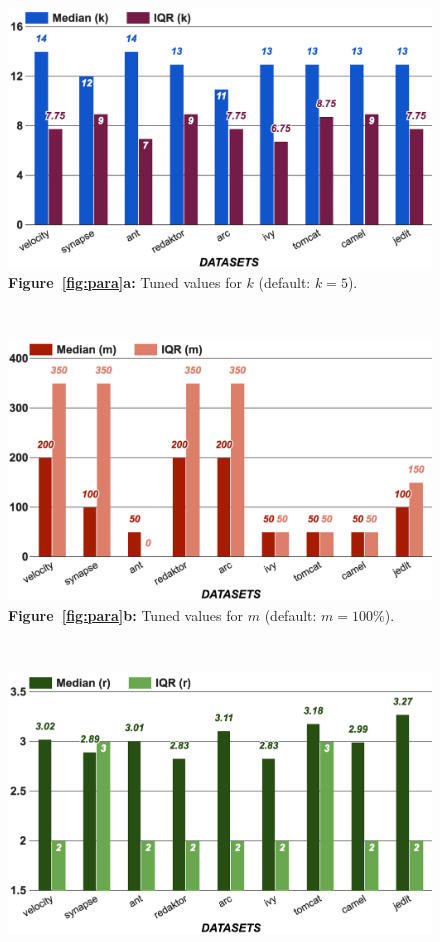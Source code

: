 \documentclass[10pt,conference]{IEEEtran}
\theoremstyle{break}
\theoremstyle{break}
\begin{document}
\begin{figure}[!b]
    \centering
    \begin{minipage}{.33\textwidth}
    \centering
        \includegraphics[width=.95\linewidth]{./fig/k.png}
        {\bf Figure~\ref{fig:para}a:} Tuned values for $k$ (default:  $k=5$).
    \end{minipage}~~%
    \begin{minipage}{.33\textwidth}
    \centering
        \includegraphics[width=.95\linewidth]{./fig/m.png}
        {\bf Figure~\ref{fig:para}b:} Tuned values for $m$ (default: $m=100\%$).
    \end{minipage}~~%
    \begin{minipage}{.33\textwidth}
    \centering
        \includegraphics[width=.95\linewidth]{./fig/r.png}

\end{minipage}
\end{figure}
\end{document}
